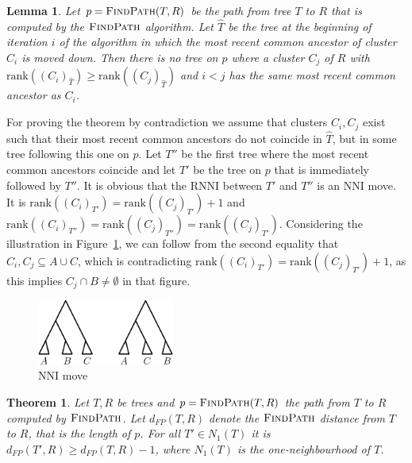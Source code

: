 \documentclass{amsart}
\newtheorem{lemma}{Lemma}
\newtheorem{theorem}{Theorem}
\newcommand{\rnni}{\mathrm{RNNI}}
\newcommand{\findpath}{\textsc{FindPath}}
\newcommand{\rank}{\mathrm{rank}}
\newcommand{\nni}{\mathrm{NNI}}
\begin{document}
\begin{lemma}
    Let $p = \findpath(T,R)$ be the path from tree $T$ to $R$ that is computed by the $\findpath$ algorithm.
    Let $\hat{T}$ be the tree at the beginning of iteration $i$ of the algorithm in which the most recent common ancestor of cluster $C_i$ is moved down.
    Then there is no tree on $p$ where a cluster $C_j$ of $R$ with $\rank((C_i)_{\hat{T}}) \geq \rank((C_j)_{\hat{T}})$ and $i < j$ has the same most recent common ancestor as $C_i$.
\end{lemma}

\proof

For proving the theorem by contradiction we assume that clusters $C_i, C_j$ exist such that their most recent common ancestors do not coincide in $\hat{T}$, but in some tree following this one on $p$.
Let $T''$ be the first tree where the most recent common ancestors coincide and let $T'$ be the tree on $p$ that is immediately followed by $T''$.
It is obvious that the $\rnni$ between $T'$ and $T''$ is an $\nni$ move.
It is $\rank((C_i)_{T'}) = \rank((C_j)_{T'}) + 1$ and $\rank((C_i)_{T''}) = \rank((C_j)_{T''}) = \rank((C_j)_{T'})$.
Considering the illustration in Figure~\ref{fig:nni_move}, we can follow from the second equality that $C_i, C_j \subseteq A \cup C$, which is contradicting $\rank((C_i)_{T'}) = \rank((C_j)_{T'}) + 1$, as this implies $C_j \cap B \neq \emptyset$ in that figure.


\begin{figure}[H]
\centering
\includegraphics[width=0.4\textwidth]{NNI_move}
\vspace{12pt}
\caption{$\nni$ move}
\label{fig:nni_move}
\end{figure}

\endproof

\begin{theorem}
    Let $T,R$ be trees and $p = \findpath(T,R)$ the path from $T$ to $R$ computed by $\findpath$.
    Let $d_{FP}(T,R)$ denote the $\findpath$ distance from $T$ to $R$, that is the length of $p$.
    For all $T' \in N_1(T)$ it is $d_{FP}(T',R) \geq d_{FP}(T,R) - 1$, where $N_1(T)$ is the one-neighbourhood of $T$.
\end{theorem}
\end{document}
